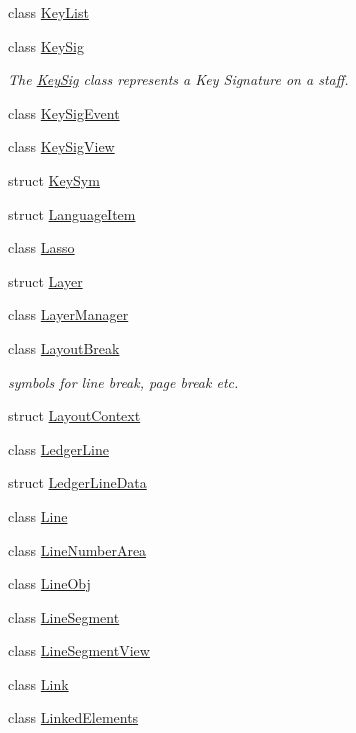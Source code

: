 \begin{DoxyCompactItemize}
\item 
class \hyperlink{class_ms_1_1_key_list}{Key\+List}
\item 
class \hyperlink{class_ms_1_1_key_sig}{Key\+Sig}
\begin{DoxyCompactList}\small\item\em The \hyperlink{class_ms_1_1_key_sig}{Key\+Sig} class represents a Key Signature on a staff. \end{DoxyCompactList}\item 
class \hyperlink{class_ms_1_1_key_sig_event}{Key\+Sig\+Event}
\item 
class \hyperlink{class_ms_1_1_key_sig_view}{Key\+Sig\+View}
\item 
struct \hyperlink{struct_ms_1_1_key_sym}{Key\+Sym}
\item 
struct \hyperlink{struct_ms_1_1_language_item}{Language\+Item}
\item 
class \hyperlink{class_ms_1_1_lasso}{Lasso}
\item 
struct \hyperlink{struct_ms_1_1_layer}{Layer}
\item 
class \hyperlink{class_ms_1_1_layer_manager}{Layer\+Manager}
\item 
class \hyperlink{class_ms_1_1_layout_break}{Layout\+Break}
\begin{DoxyCompactList}\small\item\em symbols for line break, page break etc. \end{DoxyCompactList}\item 
struct \hyperlink{struct_ms_1_1_layout_context}{Layout\+Context}
\item 
class \hyperlink{class_ms_1_1_ledger_line}{Ledger\+Line}
\item 
struct \hyperlink{struct_ms_1_1_ledger_line_data}{Ledger\+Line\+Data}
\item 
class \hyperlink{class_ms_1_1_line}{Line}
\item 
class \hyperlink{class_ms_1_1_line_number_area}{Line\+Number\+Area}
\item 
class \hyperlink{class_ms_1_1_line_obj}{Line\+Obj}
\item 
class \hyperlink{class_ms_1_1_line_segment}{Line\+Segment}
\item 
class \hyperlink{class_ms_1_1_line_segment_view}{Line\+Segment\+View}
\item 
class \hyperlink{class_ms_1_1_link}{Link}
\item 
class \hyperlink{class_ms_1_1_linked_elements}{Linked\+Elements}
\item 

\end{DoxyCompactItemize}
